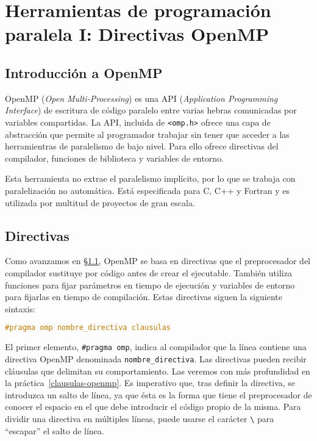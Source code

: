 \chapter{Herramientas de programación paralela I\@: Directivas OpenMP}\label{directivas-openmp}

\section{Introducción a OpenMP}\label{directivas-openmp-introduccion}

OpenMP (\textit{Open Multi-Processing}) es una API (\textit{Application Programming Interface}) de escritura de código paralelo entre varias hebras comunicadas por variables compartidas.
La API, incluida de \texttt{<omp.h>} ofrece una capa de abstracción que permite al programador trabajar sin tener que acceder a las herramientras de paralelismo de bajo nivel.
Para ello ofrece directivas del compilador, funciones de biblioteca y variables de entorno.

Esta herramienta no extrae el paralelismo implícito, por lo que se trabaja con paralelización no automática.
Está especificada para C, C++ y Fortran y es utilizada por multitud de proyectos de gran escala.

\section{Directivas}\label{directivas-openmp-directivas}

Como avanzamos en \S\ref{directivas-openmp-introduccion}, OpenMP se basa en directivas que el preprocesador del compilador sustituye por código antes de crear el ejecutable.
También utiliza funciones para fijar parámetros en tiempo de ejecución y variables de entorno para fijarlas en tiempo de compilación.
Estas directivas siguen la siguiente sintaxis:

\begin{lstlisting}[language=C]
#pragma omp nombre_directiva clausulas
\end{lstlisting}

El primer elemento, \texttt{\#pragma omp}, indica al compilador que la línea contiene una directiva OpenMP denominada \texttt{nombre\_directiva}.
Las directivas pueden recibir cláusulas que delimitan su comportamiento.
Las veremos con más profundidad en la práctica~\ref{clausulas-openmp}.
Es imperativo que, tras definir la directiva, se introduzca un salto de línea, ya que ésta es la forma que tiene el preprocesador de conocer el espacio en el que debe introducir el código propio de la misma.
Para dividir una directiva en múltiples líneas, puede usarse el carácter \texttt{\textbackslash} para ``escapar'' el salto de línea.

